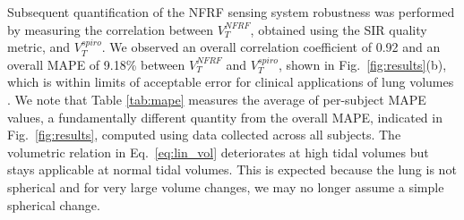 \documentclass[journal,twoside,web]{ieeecolor}
\begin{document}
Subsequent quantification of the NFRF sensing system robustness was performed by measuring the correlation between $V^{NFRF}_T$, obtained using the SIR quality metric, and $V^{spiro}_T$. We observed an overall correlation coefficient of 0.92 and an overall MAPE of 9.18\% between $V^{NFRF}_T$ and $V^{spiro}_T$, shown in Fig.~\ref{fig:results}(b), which is within limits of acceptable error for clinical applications of lung volumes \cite{grivansPositiveEndexpiratoryPressureinduced2011a}\cite{crivellariUseElectricalImpedance2021}. We note that Table \ref{tab:mape} measures the average of per-subject MAPE values, a fundamentally different quantity from the overall MAPE, indicated in Fig.~\ref{fig:results}, computed using data collected across all subjects. The volumetric relation in Eq.~\ref{eq:lin_vol} deteriorates at high tidal volumes but stays applicable at normal tidal volumes. This is expected because the lung is not spherical and for very large volume changes, we may no longer assume a simple spherical change.  
\end{document}
